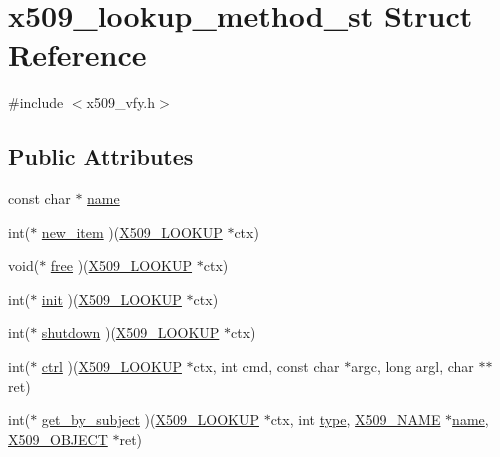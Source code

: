 \hypertarget{structx509__lookup__method__st}{}\section{x509\+\_\+lookup\+\_\+method\+\_\+st Struct Reference}
\label{structx509__lookup__method__st}


{\ttfamily \#include $<$x509\+\_\+vfy.\+h$>$}

\subsection*{Public Attributes}
\begin{DoxyCompactItemize}
\item 
const char $\ast$ \hyperlink{structx509__lookup__method__st_a57a76d2d34d7749b3874c7809337390c}{name}
\item 
int($\ast$ \hyperlink{structx509__lookup__method__st_a308b007d8cb1b10bc525d9a8a794926e}{new\+\_\+item} )(\hyperlink{x509__vfy_8h_afcefc7fb9c7573debf6c1d28b28ff618}{X509\+\_\+\+L\+O\+O\+K\+UP} $\ast$ctx)
\item 
void($\ast$ \hyperlink{structx509__lookup__method__st_a0ef0e21d7fe023bc976d002e1dd5a810}{free} )(\hyperlink{x509__vfy_8h_afcefc7fb9c7573debf6c1d28b28ff618}{X509\+\_\+\+L\+O\+O\+K\+UP} $\ast$ctx)
\item 
int($\ast$ \hyperlink{structx509__lookup__method__st_a04ca0ebad723cae3fa9cb487c56e09a0}{init} )(\hyperlink{x509__vfy_8h_afcefc7fb9c7573debf6c1d28b28ff618}{X509\+\_\+\+L\+O\+O\+K\+UP} $\ast$ctx)
\item 
int($\ast$ \hyperlink{structx509__lookup__method__st_aa201108d16466a85c87dd0b86288087a}{shutdown} )(\hyperlink{x509__vfy_8h_afcefc7fb9c7573debf6c1d28b28ff618}{X509\+\_\+\+L\+O\+O\+K\+UP} $\ast$ctx)
\item 
int($\ast$ \hyperlink{structx509__lookup__method__st_a87357ddd14742495a20e4e7be7cdfab2}{ctrl} )(\hyperlink{x509__vfy_8h_afcefc7fb9c7573debf6c1d28b28ff618}{X509\+\_\+\+L\+O\+O\+K\+UP} $\ast$ctx, int cmd, const char $\ast$argc, long argl, char $\ast$$\ast$ret)
\item 
int($\ast$ \hyperlink{structx509__lookup__method__st_a2d6e3c3cc73f583d6d970abe12b65df2}{get\+\_\+by\+\_\+subject} )(\hyperlink{x509__vfy_8h_afcefc7fb9c7573debf6c1d28b28ff618}{X509\+\_\+\+L\+O\+O\+K\+UP} $\ast$ctx, int \hyperlink{x509_8h_ab512b8f495325c7ea0f5a5a5d3f938eb}{type}, \hyperlink{ossl__typ_8h_a5c5fc036757e87b9bd163d0221696533}{X509\+\_\+\+N\+A\+ME} $\ast$\hyperlink{structx509__lookup__method__st_a57a76d2d34d7749b3874c7809337390c}{name}, \hyperlink{x509__vfy_8h_a49c000712efcfeff1e403cb1242052e9}{X509\+\_\+\+O\+B\+J\+E\+CT} $\ast$ret)
$$
\end{DoxyCompactItemize}
